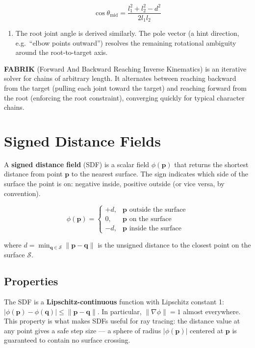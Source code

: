 \documentclass[
  11pt,
  letterpaper,
  DIV=11,
  numbers=noendperiod,
  twoside,
  open=right]{scrreprt}
\providecommand{\tightlist}{%
  \setlength{\itemsep}{0pt}\setlength{\parskip}{0pt}}
\begin{document}
\[
\cos\theta_{\text{mid}} = \frac{l_1^2 + l_2^2 - d^2}{2 l_1 l_2}
\]

\begin{enumerate}
\def\labelenumi{\arabic{enumi}.}
\setcounter{enumi}{3}
\tightlist
\item
  The root joint angle is derived similarly. The pole vector (a hint
  direction, e.g.~``elbow points outward'') resolves the remaining
  rotational ambiguity around the root-to-target axis.
\end{enumerate}

\textbf{FABRIK} (Forward And Backward Reaching Inverse Kinematics) is an
iterative solver for chains of arbitrary length. It alternates between
reaching backward from the target (pulling each joint toward the target)
and reaching forward from the root (enforcing the root constraint),
converging quickly for typical character chains.

\section{Signed Distance Fields}\label{signed-distance-fields}

A \textbf{signed distance field} (SDF) is a scalar field
\(\phi(\mathbf{p})\) that returns the shortest distance from point
\(\mathbf{p}\) to the nearest surface. The sign indicates which side of
the surface the point is on: negative inside, positive outside (or vice
versa, by convention).

\[
\phi(\mathbf{p}) = \begin{cases}
  +d, & \mathbf{p} \text{ outside the surface} \\
  0, & \mathbf{p} \text{ on the surface} \\
  -d, & \mathbf{p} \text{ inside the surface}
\end{cases}
\]

where
\(d = \min_{\mathbf{q} \in \mathcal{S}} \|\mathbf{p} - \mathbf{q}\|\) is
the unsigned distance to the closest point on the surface
\(\mathcal{S}\).

\subsection{Properties}\label{properties}

The SDF is a \textbf{Lipschitz-continuous} function with Lipschitz
constant 1:
\(|\phi(\mathbf{p}) - \phi(\mathbf{q})| \leq \|\mathbf{p} - \mathbf{q}\|\).
In particular, \(\|\nabla\phi\| = 1\) almost everywhere. This property
is what makes SDFs useful for ray tracing: the distance value at any
point gives a safe step size --- a sphere of radius
\(|\phi(\mathbf{p})|\) centered at \(\mathbf{p}\) is guaranteed to
contain no surface crossing.
\end{document}
